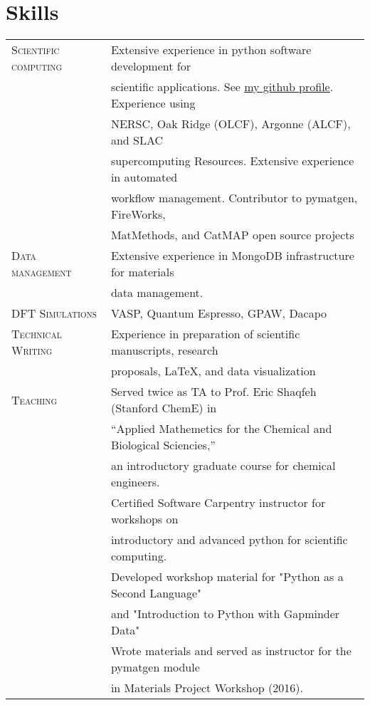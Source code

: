 \documentclass[a4paper,10pt]{article}
\begin{document}
\section{Skills}
\begin{tabular}{ll}
 \textsc{Scientific computing} & Extensive experience in python software development for \\ 
 & scientific applications.  See \href{https://github.com/montoyjh}{my github profile}. Experience using\\
 & NERSC, Oak Ridge (OLCF), Argonne (ALCF), and SLAC \\
 &supercomputing Resources.  Extensive experience in automated \\
 &workflow management. Contributor to pymatgen, FireWorks,\\
 &MatMethods, and CatMAP open source projects\vspace{0.05in}\\
 \textsc{Data management} & Extensive experience in MongoDB infrastructure for materials \\
 & data management. \vspace{0.05in}\\
 \textsc{DFT Simulations} & VASP, Quantum Espresso, GPAW, Dacapo \vspace{0.05in}\\
 \textsc{Technical Writing} & Experience in preparation of scientific manuscripts, research \\
 & proposals, \LaTeX, and data visualization \vspace{0.05in}\\
 \textsc{Teaching} & Served twice as TA to Prof. Eric Shaqfeh (Stanford ChemE) in \\
 &``Applied Mathemetics for the Chemical and Biological Sciencies,'' \\
 &an introductory graduate course for chemical engineers.\vspace{0.05in}\\
 &Certified Software Carpentry instructor for workshops on 
 \\&introductory and advanced python for scientific computing. 
 \\&Developed workshop material for "Python as a Second Language"
 \\&and "Introduction to Python with Gapminder Data"\vspace{0.05in}  
 \\&Wrote materials and served as instructor for the pymatgen module
 \\&in Materials Project Workshop (2016).
\end{tabular}
\end{document}
